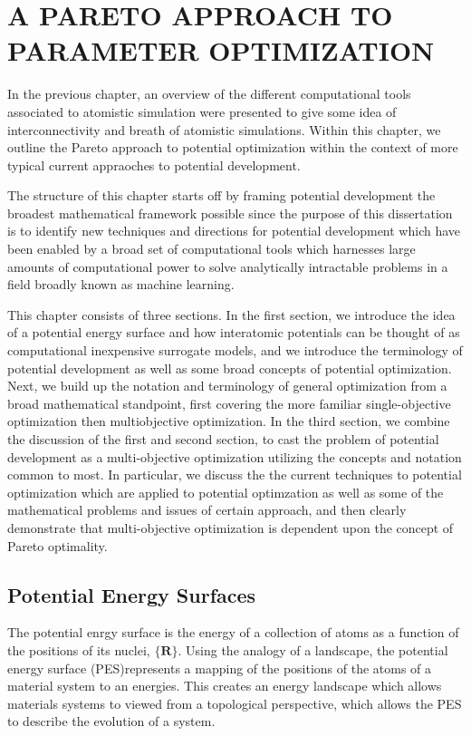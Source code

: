 \chapter{A PARETO APPROACH TO PARAMETER OPTIMIZATION}

In the previous chapter, an overview of the different computational tools associated to atomistic simulation were presented to give some idea of interconnectivity and breath of atomistic simulations.  Within this chapter, we outline the Pareto approach to potential optimization within the context of more typical current appraoches to potential development.

The structure of this chapter starts off by framing potential development the broadest mathematical framework possible since the purpose of this dissertation is to identify new techniques and directions for potential development which have been enabled by a broad set of computational tools which harnesses large amounts of computational power to solve analytically intractable problems in a field broadly known as machine learning.  

This chapter consists of three sections.  In the first section, we introduce the idea of a potential energy surface and how interatomic potentials can be thought of as computational inexpensive surrogate models, and we introduce the terminology of potential development as well as some broad concepts of potential optimization.  
Next, we build up the notation and terminology of general optimization from a broad mathematical standpoint, first covering the more familiar single-objective optimization then multiobjective optimization.
In the third section, we combine the discussion of the first and second section, to cast the problem of potential development as a multi-objective optimization utilizing the concepts and notation common to most.  
In particular, we discuss the the current techniques to potential optimization which are applied to potential optimzation as well as some of the mathematical problems and issues of certain approach, and then clearly demonstrate that multi-objective optimization is dependent upon the concept of Pareto optimality.

\section{Potential Energy Surfaces}

The potential enrgy surface is the energy of a collection of atoms as a function of the positions of its nuclei, $\{\bm{R}\}$.  
Using the analogy of a landscape, the potential energy surface (PES)represents a mapping of the positions of the atoms of a material system to an energies.  
This creates an energy landscape which allows materials systems to viewed from a topological perspective, which allows the PES to describe the evolution of a system.
\\

